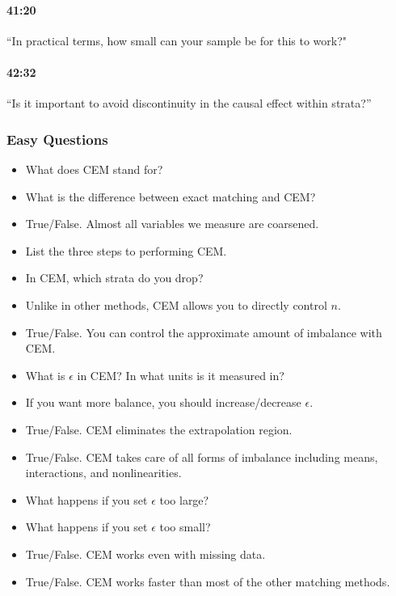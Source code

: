 \documentclass[11pt]{article}
\begin{document}
\paragraph{41:20} ``In practical terms, how small can your sample be for this to work?" 

\paragraph{42:32} ``Is it important to avoid discontinuity in the causal effect within strata?''


\subsubsection{Easy Questions}


\begin{itemize}

\item What does CEM stand for?

\item What is the difference between exact matching and CEM?

\item True/False.  Almost all variables we measure are coarsened.
 
\item List the three steps to performing CEM.

\item In CEM, which strata do you drop?

\item Unlike in other methods, CEM allows you to directly control $n$.

\item True/False.  You can control the approximate amount of imbalance with CEM.

\item What is $\epsilon$ in CEM?  In what units is it measured in?

\item If you want more balance, you should increase/decrease $\epsilon$.

\item True/False.  CEM eliminates the extrapolation region.

\item True/False.  CEM takes care of all forms of imbalance including means, interactions, and nonlinearities.

\item What happens if you set $\epsilon$ too large?

\item What happens if you set $\epsilon$ too small?

\item True/False.  CEM works even with missing data.

\item True/False.  CEM works faster than most of the other matching methods.

\end{itemize}
\end{document}
